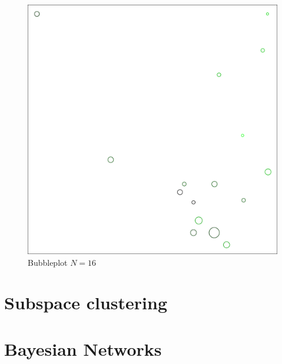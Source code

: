 \documentclass[letterpaper,12pt]{article}
\begin{document}
\begin{figure}[h]
  \centering
  \includegraphics[width=\linewidth]{biclust-bubbleplot-16.pdf}
  \caption{Bubbleplot $N = 16$}
  \label{fig:bubbleplot-16}
\end{figure}

\section{Subspace clustering}


\section{Bayesian Networks}
\end{document}
